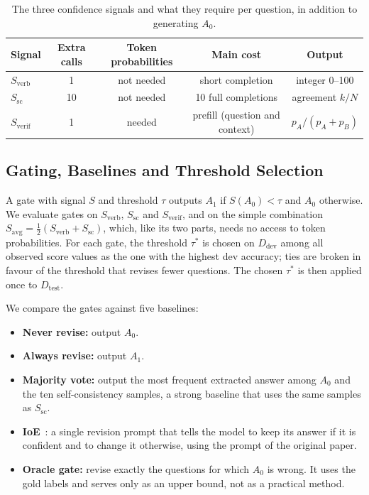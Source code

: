 \begin{table}[h!]
\caption{The three confidence signals and what they require per question, in addition to generating $A_0$.}
\centering
\small
\begin{tabular}{lcccc}
\toprule
Signal & Extra calls & Token probabilities & Main cost & Output \\
\midrule
$S_{\text{verb}}$  & 1  & not needed & short completion & integer 0--100 \\
$S_{\text{sc}}$    & 10 & not needed & 10 full completions & agreement $k/N$ \\
$S_{\text{verif}}$ & 1  & needed     & prefill (question and context) & $p_A/(p_A+p_B)$ \\
\bottomrule
\end{tabular}
\label{tab:signals}
\end{table}

\subsection{Gating, Baselines and Threshold Selection}
A gate with signal $S$ and threshold $\tau$ outputs $A_1$ if $S(A_0)<\tau$ and $A_0$ otherwise. We evaluate gates on $S_{\text{verb}}$, $S_{\text{sc}}$ and $S_{\text{verif}}$, and on the simple combination $S_{\text{avg}}=\tfrac12(S_{\text{verb}}+S_{\text{sc}})$, which, like its two parts, needs no access to token probabilities. For each gate, the threshold $\tau^*$ is chosen on $D_{\text{dev}}$ among all observed score values as the one with the highest dev accuracy; ties are broken in favour of the threshold that revises fewer questions. The chosen $\tau^*$ is then applied once to $D_{\text{test}}$.

We compare the gates against five baselines:
\begin{itemize}
    \item \textbf{Never revise:} output $A_0$.
    \item \textbf{Always revise:} output $A_1$.
    \item \textbf{Majority vote:} output the most frequent extracted answer among $A_0$ and the ten self-consistency samples, a strong baseline that uses the same samples as $S_{\text{sc}}$.
    \item \textbf{IoE}~\cite{li2024confidence}: a single revision prompt that tells the model to keep its answer if it is confident and to change it otherwise, using the prompt of the original paper.
    \item \textbf{Oracle gate:} revise exactly the questions for which $A_0$ is wrong. It uses the gold labels and serves only as an upper bound, not as a practical method.
\end{itemize}

